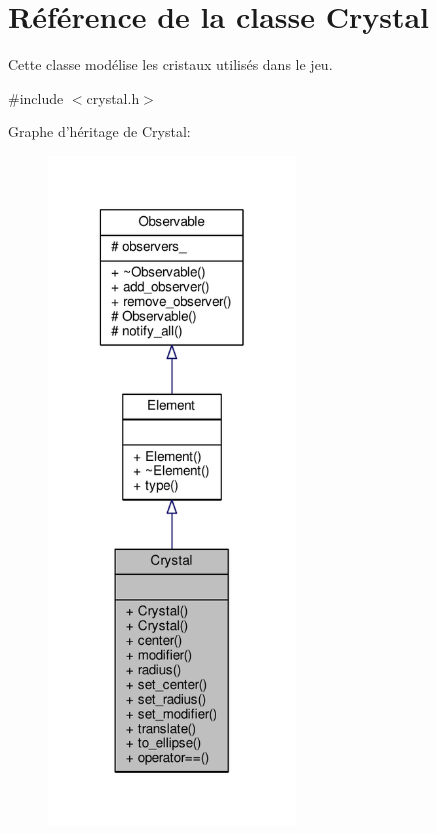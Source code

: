 \hypertarget{classCrystal}{\section{Référence de la classe Crystal}
\label{classCrystal}
}


Cette classe modélise les cristaux utilisés dans le jeu.  




{\ttfamily \#include $<$crystal.\+h$>$}



Graphe d'héritage de Crystal\+:
\nopagebreak
\begin{figure}[H]
\begin{center}
\leavevmode
\includegraphics[width=186pt]{de/da2/classCrystal__inherit__graph}
\end{center}
\end{figure}


